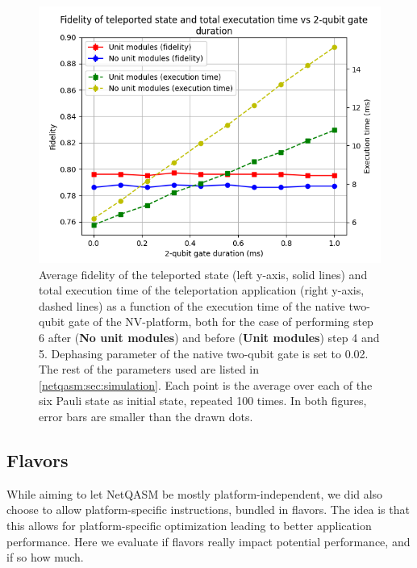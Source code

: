 \begin{figure}[t]
    \centering
    \includegraphics[scale=0.8]{figures/netqasm/plots/paper_teleport_sweep_gate_time.png}
    \caption{
        Average fidelity of the teleported state (left y-axis, solid lines) and total
        execution time of the teleportation application (right y-axis, dashed
        lines) as a function of the execution time of the native two-qubit gate
        of the NV-platform, both for the case of performing step 6 after
        (\textbf{No unit modules}) and before (\textbf{Unit modules}) step 4 and
        5. Dephasing parameter of the native two-qubit gate is set to 0.02. The
        rest of the parameters used are listed in \cref{netqasm:sec:simulation}. Each
        point is the average over each of the six Pauli state as initial state,
        repeated 100 times. In both figures, error bars are smaller than the drawn
        dots.}
  \label{netqasm:fig:sweep_gate_time}
\end{figure}



\subsection{Flavors}
\label{netqasm:sec:evaluation-flavours}
While aiming to let \ac{NetQASM} be mostly platform-independent, we did also choose to allow platform-specific instructions, bundled in flavors.
The idea is that this allows for platform-specific optimization leading to better application performance.
Here we evaluate if flavors really impact potential performance, and if so how much.

